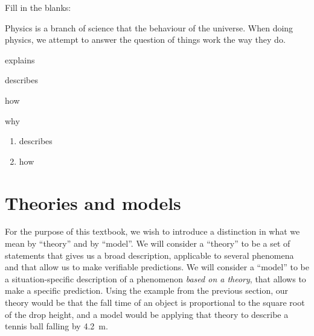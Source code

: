 \begin{checkpoint}
\begin{MCquestion}{Fill in the blanks:

Physics is a branch of science that \underline{\hspace{2cm}} the behaviour of the universe. When doing physics, we attempt to answer the question of \underline{\hspace{2cm}} things work the way they do.}
\item explains
\item describes 
\item how 
\item why
\end{MCquestion}
\begin{answer}
\begin{enumerate}
\item describes
\item how
\end{enumerate}
\end{answer}
\end{checkpoint}

\section{Theories and models}
For the purpose of this textbook, we wish to introduce a distinction in what we mean by ``theory'' and by ``model''. We will consider a ``theory'' to be a set of statements that gives us a broad description, applicable to several phenomena and that allow us to make verifiable predictions. We will consider a ``model'' to be a situation-specific description of a phenomenon \textit{based on a theory}, that allows to make a specific prediction. Using the example from the previous section, our theory would be that the fall time of an object is proportional to the square root of the drop height, and a model would be applying that theory to describe a tennis ball falling by \SI{4.2}{\meter}.


